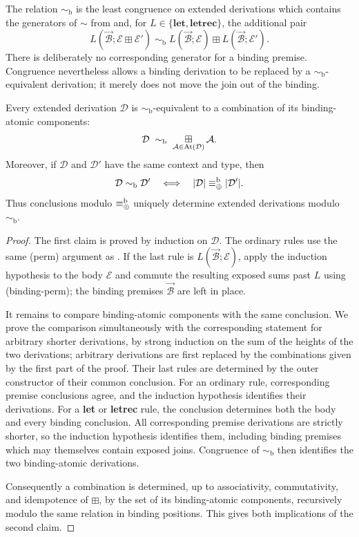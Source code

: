 \begin{definition}
\label{def:binding_perm_equiv}
The relation $\sim_{\mathrm b}$ is the least congruence on extended
derivations which contains the generators of $\sim$ from
 and, for $L\in\{\textbf{let},\textbf{letrec}\}$, the
additional pair
\[
L(\vec{\mathcal B};\mathcal E\boxplus\mathcal E')
\;\sim_{\mathrm b}\;
L(\vec{\mathcal B};\mathcal E)
  \boxplus L(\vec{\mathcal B};\mathcal E').
\tag{binding-perm}
\]
There is deliberately no corresponding generator for a binding premise.
Congruence nevertheless allows a binding derivation to be replaced by a
$\sim_{\mathrm b}$-equivalent derivation; it merely does not move the join out
of the binding.
\end{definition}

\begin{theorem}
\label{theorem:binding_coherence}
Every extended derivation $\mathcal D$ is $\sim_{\mathrm b}$-equivalent to a
combination of its binding-atomic components:
\[
\mathcal D\;\sim_{\mathrm b}\;
\mathop{\boxplus}\displaylimits_{\mathcal A\in\operatorname{At}(\mathcal D)}\mathcal A.
\]
Moreover, if $\mathcal D$ and $\mathcal D'$ have the same context and type,
then
\[
\mathcal D\sim_{\mathrm b}\mathcal D'
\quad\Longleftrightarrow\quad
|\mathcal D|\equiv_{\mathbin{\oplus}}^{\mathrm b}|\mathcal D'|.
\]
Thus conclusions modulo $\equiv_{\mathbin{\oplus}}^{\mathrm b}$ uniquely determine extended
derivations modulo $\sim_{\mathrm b}$.
\end{theorem}
\begin{proof}
The first claim is proved by induction on $\mathcal D$.  The ordinary rules
use the same (perm) argument as .  If the last rule is
$L(\vec{\mathcal B};\mathcal E)$, apply the induction hypothesis to the body
$\mathcal E$ and commute the resulting exposed sums past $L$ using
(binding-perm); the binding premises $\vec{\mathcal B}$ are left in place.

It remains to compare binding-atomic components with the same conclusion.
We prove the comparison simultaneously with the corresponding statement for
arbitrary shorter derivations, by strong induction on the sum of the heights
of the two derivations; arbitrary derivations are first replaced by the
combinations given by the first part of the proof.
Their last rules are determined by the outer constructor of their common
conclusion.  For an ordinary rule, corresponding premise conclusions agree,
and the induction hypothesis identifies their derivations.  For a
\textbf{let} or \textbf{letrec} rule, the conclusion determines both the body
and every binding conclusion.  All corresponding premise derivations are
strictly shorter, so the induction hypothesis identifies them, including
binding premises which may themselves contain exposed joins.  Congruence of
$\sim_{\mathrm b}$ then identifies the two binding-atomic derivations.

Consequently a combination is determined, up to associativity,
commutativity, and idempotence of $\boxplus$, by the set of its
binding-atomic components, recursively modulo the same relation in binding
positions.  This gives both implications of the second claim.
\end{proof}

